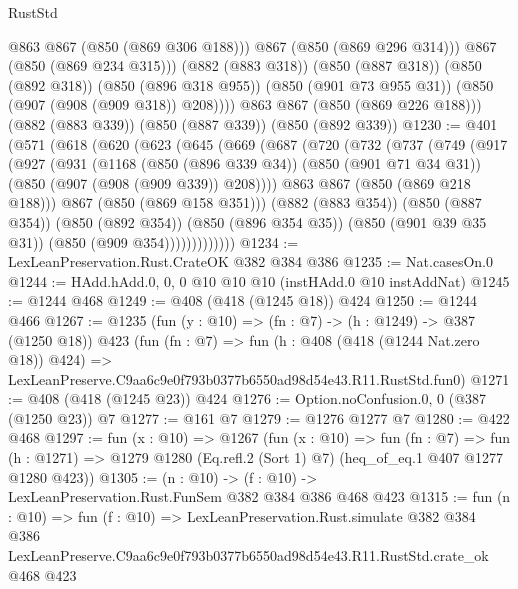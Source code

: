 \begin{lexlean}{RustStd}
\begin{coremodule}
                @863
                @867
                (@850 (@869 @306 @188)))
              @867
              (@850 (@869 @296 @314)))
            @867
            (@850 (@869 @234 @315)))
          (@882 (@883 @318))
          (@850 (@887 @318))
          (@850 (@892 @318))
          (@850 (@896 @318 @955))
          (@850 (@901 @73 @955 @31))
          (@850 (@907 (@908 (@909 @318)) @208))))
      @863
      @867
      (@850 (@869 @226 @188)))
    (@882 (@883 @339))
    (@850 (@887 @339))
    (@850 (@892 @339))
@1230 := @401
    (@571
      (@618
        (@620
          (@623
            (@645
              (@669
                (@687
                  (@720
                    (@732
                      (@737
                        (@749
                          (@917
                            (@927
                              (@931
                                (@1168
                                  (@850 (@896 @339 @34))
                                  (@850 (@901 @71 @34 @31))
                                  (@850 (@907 (@908 (@909 @339)) @208))))
                              @863
                              @867
                              (@850 (@869 @218 @188)))
                            @867
                            (@850 (@869 @158 @351)))
                          (@882 (@883 @354))
                          (@850 (@887 @354))
                          (@850 (@892 @354))
                          (@850 (@896 @354 @35))
                          (@850 (@901 @39 @35 @31))
                          (@850 (@909 @354)))))))))))))
@1234 := LexLeanPreservation.Rust.CrateOK @382 @384 @386
@1235 := Nat.casesOn.{0}
@1244 := HAdd.hAdd.{0, 0, 0} @10 @10 @10 (instHAdd.{0} @10 instAddNat)
@1245 := @1244 @468
@1249 := @408 (@418 (@1245 @18)) @424
@1250 := @1244 @466
@1267 := @1235
    (fun (y : @10) => (fn : @7) -> (h : @1249) -> @387 (@1250 @18))
    @423
    (fun (fn : @7) =>
    fun (h : @408 (@418 (@1244 Nat.zero @18)) @424) =>
    LexLeanPreserve.C9aa6c9e0f793b0377b6550ad98d54e43.R11.RustStd.fun0)
@1271 := @408 (@418 (@1245 @23)) @424
@1276 := Option.noConfusion.{0, 0} (@387 (@1250 @23)) @7
@1277 := @161 @7
@1279 := @1276 @1277 @7
@1280 := @422 @468
@1297 := fun (x : @10) =>
  @1267
    (fun (x : @10) =>
    fun (fn : @7) =>
    fun (h : @1271) => @1279 @1280 (Eq.refl.{2} (Sort 1) @7) (heq_of_eq.{1} @407 @1277 @1280 @423))
@1305 := (n : @10) -> (f : @10) -> LexLeanPreservation.Rust.FunSem @382 @384 @386 @468 @423
@1315 := fun (n : @10) =>
  fun (f : @10) =>
  LexLeanPreservation.Rust.simulate
    @382
    @384
    @386
    LexLeanPreserve.C9aa6c9e0f793b0377b6550ad98d54e43.R11.RustStd.crate_ok
    @468
    @423
\end{coremodule}
\end{lexlean}
